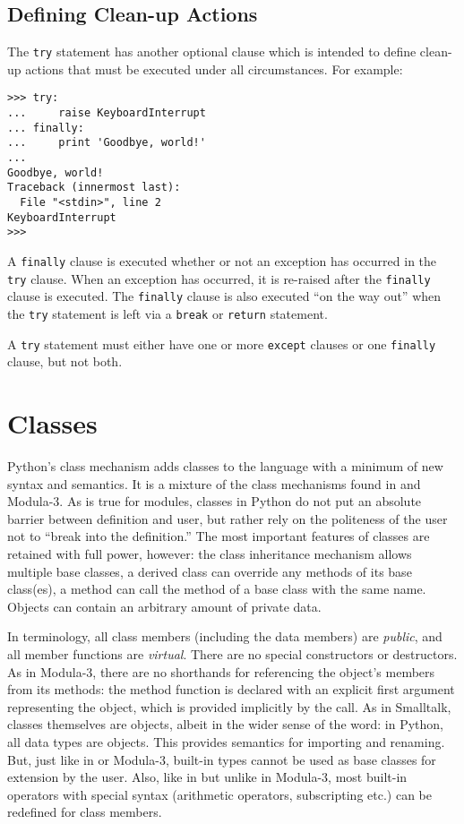 \section{Defining Clean-up Actions}

The {\tt try} statement has another optional clause which is intended to
define clean-up actions that must be executed under all circumstances.
For example:

\bcode\begin{verbatim}
>>> try:
...     raise KeyboardInterrupt
... finally:
...     print 'Goodbye, world!'
... 
Goodbye, world!
Traceback (innermost last):
  File "<stdin>", line 2
KeyboardInterrupt
>>> 
\end{verbatim}\ecode
%
A {\tt finally} clause is executed whether or not an exception has
occurred in the {\tt try} clause.  When an exception has occurred, it
is re-raised after the {\tt finally} clause is executed.  The
{\tt finally} clause is also executed ``on the way out'' when the
{\tt try} statement is left via a {\tt break} or {\tt return}
statement.

A {\tt try} statement must either have one or more {\tt except}
clauses or one {\tt finally} clause, but not both.


\chapter{Classes}

Python's class mechanism adds classes to the language with a minimum
of new syntax and semantics.  It is a mixture of the class mechanisms
found in \Cpp{} and Modula-3.  As is true for modules, classes in Python
do not put an absolute barrier between definition and user, but rather
rely on the politeness of the user not to ``break into the
definition.''  The most important features of classes are retained
with full power, however: the class inheritance mechanism allows
multiple base classes, a derived class can override any methods of its
base class(es), a method can call the method of a base class with the
same name.  Objects can contain an arbitrary amount of private data.

In \Cpp{} terminology, all class members (including the data members) are
{\em public}, and all member functions are {\em virtual}.  There are
no special constructors or destructors.  As in Modula-3, there are no
shorthands for referencing the object's members from its methods: the
method function is declared with an explicit first argument
representing the object, which is provided implicitly by the call.  As
in Smalltalk, classes themselves are objects, albeit in the wider
sense of the word: in Python, all data types are objects.  This
provides semantics for importing and renaming.  But, just like in \Cpp{}
or Modula-3, built-in types cannot be used as base classes for
extension by the user.  Also, like in \Cpp{} but unlike in Modula-3, most
built-in operators with special syntax (arithmetic operators,
subscripting etc.) can be redefined for class members.


